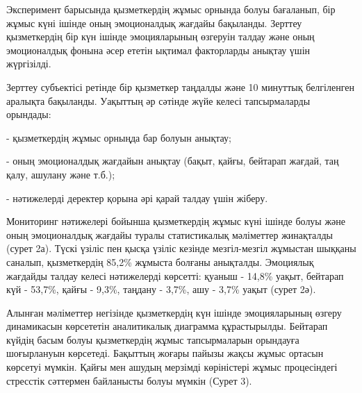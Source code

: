 \begin{multicols}{2}

Эксперимент барысында қызметкердің жұмыс орнында болуы бағаланып, бір
жұмыс күні ішінде оның эмоционалдық жағдайы бақыланды. Зерттеу
қызметкердің бір күн ішінде эмоцияларының өзгеруін талдау және оның
эмоционалдық фонына әсер ететін ықтимал факторларды анықтау үшін
жүргізілді.

Зерттеу субъектісі ретінде бір қызметкер таңдалды және 10 минуттық
белгіленген аралықта бақыланды. Уақыттың әр сәтінде жүйе келесі
тапсырмаларды орындады:

- қызметкердің жұмыс орныңда бар болуын анықтау;

- оның эмоционалдық жағдайын анықтау (бақыт, қайғы, бейтарап жағдай, таң
қалу, ашулану және т.б.);

- нәтижелерді деректер қорына әрі қарай талдау үшін жіберу.

Мониторинг нәтижелері бойынша қызметкердің жұмыс күні ішінде болуы және
оның эмоционалдық жағдайы туралы статистикалық мәліметтер жинақталды
(сурет 2а). Түскі үзіліс пен қысқа үзіліс кезінде мезгіл-мезгіл жұмыстан
шыққаны саналып, қызметкердің 85,2\% жұмыста болғаны анықталды.
Эмоциялық жағдайды талдау келесі нәтижелерді көрсетті: қуаныш - 14,8\%
уақыт, бейтарап күй - 53,7\%, қайғы - 9,3\%, таңдану - 3,7\%, ашу -
3,7\% уақыт (сурет 2ә).

Алынған мәліметтер негізінде қызметкердің күн ішінде эмоцияларының
өзгеру динамикасын көрсететін аналитикалық диаграмма құрастырылды.
Бейтарап күйдің басым болуы қызметкердің жұмыс тапсырмаларын орындауға
шоғырлануын көрсетеді. Бақыттың жоғары пайызы жақсы жұмыс ортасын
көрсетуі мүмкін. Қайғы мен ашудың мерзімді көріністері жұмыс
процесіндегі стресстік сәттермен байланысты болуы мүмкін (Сурет 3).
\end{multicols}

